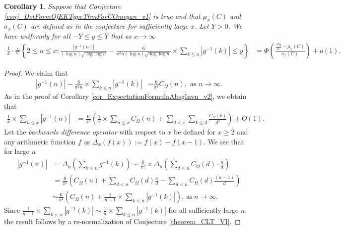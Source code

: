 \documentclass[11pt,reqno,a4letter]{article}
\numberwithin{figure}{section}
\numberwithin{table}{section}
\theoremstyle{plain}
\newtheorem{cor}[theorem]{Corollary}
\numberwithin{theorem}{section}
\theoremstyle{definition}
\begin{document}
\begin{cor} 
\label{cor_CLT_VII} 
Suppose that Conjecture \ref{conj_DetFormOfEKTypeThmForCOmegan_v1} is true and that 
$\mu_x(C)$ and $\sigma_x(C)$ are defined as in 
the conjecture for sufficiently large $x$. 
Let $Y > 0$. 
We have uniformly for all $-Y \leq y \leq Y$ 
that as $x \rightarrow \infty$ 
\begin{align*} 
\frac{1}{x} \cdot \#\left\{2 \leq n \leq x: \frac{|g^{-1}(n)|}{(\log n) \sqrt{\log\log n}} - 
     \frac{6}{\pi^2 n (\log n) \sqrt{\log\log n}} \times \sum_{k \leq n} |g^{-1}(k)| \leq y\right\} & = 
     \Phi\left(\frac{\frac{\pi^2 y}{6}-\mu_x(C)}{\sigma_x(C)}\right) + o(1). 
\end{align*} 
\end{cor} 
\begin{proof} 
We claim that 
\begin{align*} 
|g^{-1}(n)| - \frac{6}{\pi^2 n} \times \sum_{k \leq n} |g^{-1}(k)| & \sim \frac{6}{\pi^2} C_{\Omega}(n), 
     \text{\ as\ } n \rightarrow \infty. 
\end{align*} 
As in the proof of Corollary \ref{cor_ExpectationFormulaAbsgInvn_v2}, 
we obtain that 
\begin{align*} 
\frac{1}{x} \times \sum_{n \leq x} |g^{-1}(n)| & = 
     \frac{6}{\pi^2} \left(\frac{1}{x} \times \sum_{n \leq x} C_{\Omega}(n) + \sum_{d<x} 
     \sum_{k \leq d} \frac{C_{\Omega}(k)}{d^2}\right) + O(1). 
\end{align*} 
Let the \emph{backwards difference operator} with respect to $x$ 
be defined for $x \geq 2$ and any arithmetic function $f$ as 
$\Delta_x(f(x)) := f(x) - f(x-1)$. 
We see that for large $n$ 
\begin{align*} 
     |g^{-1}(n)| & = \Delta_n\left(\sum_{k \leq n} g^{-1}(k)\right)  
     \sim \frac{6}{\pi^2} \times 
     \Delta_n\left(\sum_{d \leq n} C_{\Omega}(d) \cdot \frac{n}{d}\right) \\ 
     & = \frac{6}{\pi^2}\left(C_{\Omega}(n) + \sum_{d < n} C_{\Omega}(d) \frac{n}{d} - 
     \sum_{d<n} C_{\Omega}(d) \frac{(n-1)}{d}\right) \\ 
     & \sim \frac{6}{\pi^2} \left(C_{\Omega}(n) + \frac{1}{n-1} \times \sum_{k < n} |g^{-1}(k)|\right), 
     \mathrm{\ as\ } n \rightarrow \infty. 
\end{align*} 
Since $\frac{1}{n-1} \times \sum_{k < n} |g^{-1}(k)| \sim \frac{1}{n} \times \sum_{k \leq n} |g^{-1}(k)|$ 
for all sufficiently large $n$, 
the result follows by a re-normalization of Conjecture \ref{theorem_CLT_VI}. 
\end{proof} 
\end{document}
